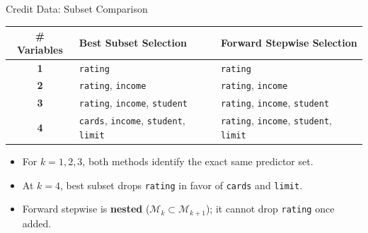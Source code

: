 \documentclass[aspectratio=169, 11pt]{beamer}
\begin{document}
\begin{frame}{Credit Data: Subset Comparison}
    \begin{table}
        \centering
        \small
        \begin{tabular}{c l l}
            \toprule
            \textbf{\# Variables} & \textbf{Best Subset Selection} & \textbf{Forward Stepwise Selection} \\
            \midrule
            \textbf{1} & \texttt{rating} & \texttt{rating} \\
            \textbf{2} & \texttt{rating}, \texttt{income} & \texttt{rating}, \texttt{income} \\
            \textbf{3} & \texttt{rating}, \texttt{income}, \texttt{student} & \texttt{rating}, \texttt{income}, \texttt{student} \\
            \textbf{4} & \texttt{cards}, \texttt{income}, \texttt{student}, \texttt{limit} & \texttt{rating}, \texttt{income}, \texttt{student}, \texttt{limit} \\
            \bottomrule
        \end{tabular}
    \end{table}
    \begin{itemize}
        \item For $k=1, 2, 3$, both methods identify the exact same predictor set.
        \item At $k=4$, best subset drops \texttt{rating} in favor of \texttt{cards} and \texttt{limit}.
        \item Forward stepwise is \textbf{nested} ($\mathcal{M}_k \subset \mathcal{M}_{k+1}$); it cannot drop \texttt{rating} once added.
    \end{itemize}
\end{frame}
\end{document}
